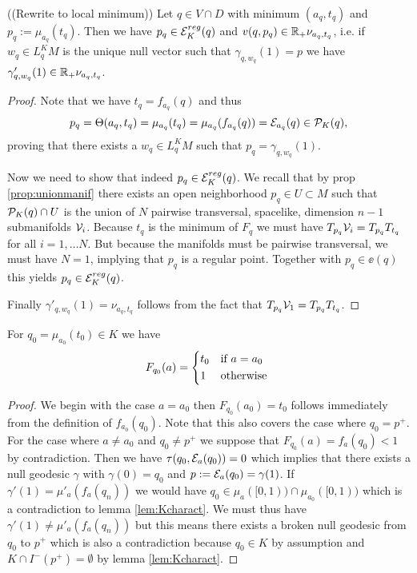 \begin{lemma}\label{lem:amin} ((Rewrite to local minimum))
    Let $q\in V\cap D$ with minimum $(a_q,t_q)$ and $p_q:=\mu_{a_q}(t_q)$. Then we have $p_q\in {{\mathcal{E}}^{reg}_K}(q)$ and $v(q,p_q)\in \mathbb{R}_+\nu_{a_q,t_q}$, i.e. if $w_q\in L^K_qM$ is the unique null vector such that $\gamma_{q,w_q}(1)=p$ we have $\gamma'_{q,w_q}(1)\in \mathbb{R}_+\nu_{a_q,t_q}$.
\end{lemma}
\begin{proof}
    Note that we have $t_q = f_{a_q}(q)$ and thus 
    \[
        p_q = \Theta(a_q,t_q)=\mu_{a_q}(t_q) = \mu_{a_q}(f_{a_q}(q)) = {\mathcal{E}}_{a_q}(q)\in {{\mathcal{P}}_K(q)},
    \] proving that there exists a $w_q\in L^K_qM$ such that $p_q = \gamma_{q,w_q}(1)$. 

    Now we need to show that indeed $p_q\in {{\mathcal{E}}^{reg}_K}(q)$.
    We recall that by prop \ref{prop:unionmanif} there exists an open neighborhood $p_q\in U\subset M$ such that ${\mathcal{P}}_K(q)\cap U$ is the union of $N$ pairwise transversal, spacelike, dimension $n-1$ submanifolds ${\mathcal{V}}_i$. Because $t_q$ is the minimum of $F_q$ we must have $T_{p_q}{{\mathcal{V}}_i} = T_{p_q}{T_{t_q}}$ for all $i=1,\dots N$. But because the manifolds must be pairwise transversal, we must have $N=1$, implying that $p_q$ is a regular point. Together with $p_q\in \ee(q)$ this yields $p_q \in {{\mathcal{E}}^{reg}_K}(q)$.

    Finally $\gamma'_{q,w_q}(1)=\nu_{a_q,t_q}$ follows from the fact that $T_{p_q}{{\mathcal{V}}_1} = T_{p_q}{T_{t_q}}$.
\end{proof}

\begin{lemma}
    For $q_0=\mu_{a_0}(t_0)\in K$ we have 
    \begin{equation*}
        F_{q_0}(a) = 
        \begin{cases*}
            t_0 & if $a=a_0$ \\
            1 & otherwise
        \end{cases*}
    \end{equation*}
\end{lemma}
\begin{proof}
    We begin with the case $a=a_0$ then $F_{q_0}(a_0)=t_0$ follows immediately from the definition of $f_{a_0}(q_0)$. Note that this also covers the case where $q_0=p^+$. For the case where $a\neq a_0$ and $q_0\neq p^+$ we suppose that $F_{q_0}(a)=f_a(q_0)<1$ by contradiction. Then we have $\tau(q_0,{\mathcal{E}}_a(q_0))=0$ which implies that there exists a null geodesic $\gamma$ with $\gamma(0)=q_0$ and $p:={\mathcal{E}}_a(q_0)=\gamma(1)$. If $\gamma'(1)=\mu'_a(f_a(q_n))$ we would have $q_0\in \mu_a([0,1)) \cap \mu_{a_0}([0,1))$ which is a contradiction to lemma \ref{lem:Kcharact}. We must thus have $\gamma'(1)\neq\mu'_a(f_a(q_n))$ but this means there exists a broken null geodesic from $q_0$ to $p^+$ which is also a contradiction because $q_0\in K$ by assumption and $K\cap I^-(p^+)=\emptyset$ by lemma \ref{lem:Kcharact}.
\end{proof}

